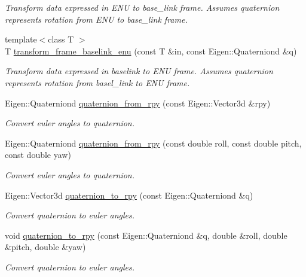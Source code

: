 \begin{DoxyCompactItemize}
\begin{DoxyCompactList}\small\item\em Transform data expressed in E\+NU to base\+\_\+link frame. Assumes quaternion represents rotation from E\+NU to base\+\_\+link frame. \end{DoxyCompactList}\item 
{\footnotesize template$<$class T $>$ }\\T \mbox{\hyperlink{group__nodelib_ga59326acc337daa1ce44d56ee6acff76b}{transform\+\_\+frame\+\_\+baselink\+\_\+enu}} (const T \&in, const Eigen\+::\+Quaterniond \&q)
\begin{DoxyCompactList}\small\item\em Transform data expressed in baselink to E\+NU frame. Assumes quaternion represents rotation from basel\+\_\+link to E\+NU frame. \end{DoxyCompactList}\item 
Eigen\+::\+Quaterniond \mbox{\hyperlink{group__nodelib_ga1f1d174745db801a82766fa0839b17e1}{quaternion\+\_\+from\+\_\+rpy}} (const Eigen\+::\+Vector3d \&rpy)
\begin{DoxyCompactList}\small\item\em Convert euler angles to quaternion. \end{DoxyCompactList}\item 
Eigen\+::\+Quaterniond \mbox{\hyperlink{group__nodelib_ga97ccf75c02bae67e6fa6fd98b804d735}{quaternion\+\_\+from\+\_\+rpy}} (const double roll, const double pitch, const double yaw)
\begin{DoxyCompactList}\small\item\em Convert euler angles to quaternion. \end{DoxyCompactList}\item 
Eigen\+::\+Vector3d \mbox{\hyperlink{group__nodelib_ga75c2e15dab0c54198e7f1e620744fb80}{quaternion\+\_\+to\+\_\+rpy}} (const Eigen\+::\+Quaterniond \&q)
\begin{DoxyCompactList}\small\item\em Convert quaternion to euler angles. \end{DoxyCompactList}\item 
void \mbox{\hyperlink{group__nodelib_gad1544765df8671798047de7800adb1b3}{quaternion\+\_\+to\+\_\+rpy}} (const Eigen\+::\+Quaterniond \&q, double \&roll, double \&pitch, double \&yaw)
\begin{DoxyCompactList}\small\item\em Convert quaternion to euler angles. \end{DoxyCompactList}\item 

\end{DoxyCompactItemize}
